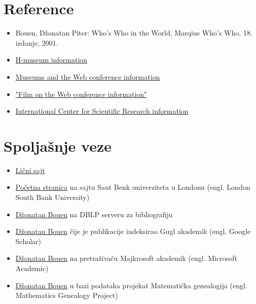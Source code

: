 \documentclass[a4paper]{article}
\begin{document}
\section{Reference}

\begin{itemize}

\item Bouen, Džonatan Piter: Who's Who in the World, Marqius Who's Who, 18. izdanje, 2001.
\item \href{https://web.archive.org/web/20060926103223/http://www.nmpft.org.uk/film/webcon05/speakers.asp#Bowen}{H-museum information}
\item \href{https://www.museumsandtheweb.com/mw2010/bios/au_3817.html}{Museums and the Web conference information}
\item \href{https://web.archive.org/web/20060926103223/http://www.nmpft.org.uk/film/webcon05/speakers.asp}{"Film on the Web conference information"}
\item \href{https://www.cirs.info/}{International Center for Scientific Research information}
\end{itemize}

\section{Spoljašnje veze}

\begin{itemize}

\item \href{www.jpbowen.com}{Lični sajt}
\item \href{http://myweb.lsbu.ac.uk/~bowenjp/}{Početna stranica} na sajtu Saut Benk univerziteta u Londonu (engl. London South Bank University)
\item \href{https://dblp.org/pers/hd/b/Bowen:Jonathan_P=}{Džonatan Bouen} na DBLP serveru za bibliografiju
\item \href{https://scholar.google.com/citations?user=L-7d2uUAAAAJ}{Džonatan Bouen} čije je publikacije indeksirao Gugl akademik (engl. Google Scholar)
\item \href{https://academic.microsoft.com/author/2311901225/publication}{Džonatan Bouen} na pretraživaču Majkrosoft akademik (engl. Microsoft Academic)
\item \href{https://scholar.google.com/citations?user=L-7d2uUAAAAJ}{Džonatan Bouen} u bazi podataka projekat Matematička genealogija (engl. Mathematics Genealogy Project)
\end{itemize}

 

\end{document}
